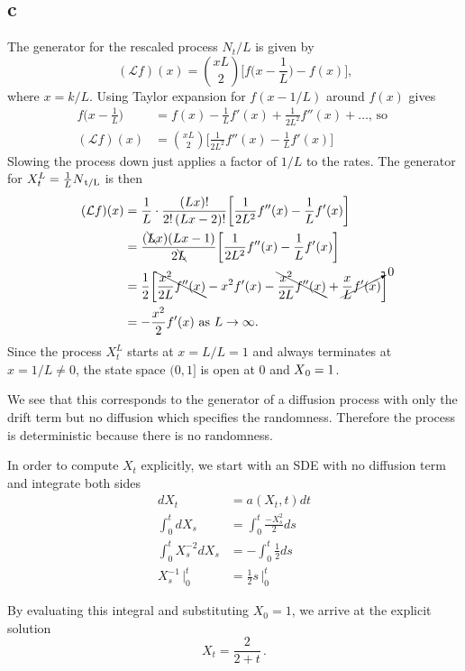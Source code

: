 \documentclass[12pt, twoside, a4paper]{article}
\newcommand{\Gen}{\mathcal{L}}
\begin{document}
\subsection*{c}
The generator for the rescaled process $N_t / L$ is given by 
\[
(\Gen f)(x) = {xL \choose 2} \bigg[ f \bigg(x - \frac{1}{L} \bigg) - f(x) \bigg] \text{,}
\]
where $x = k/L$. Using Taylor expansion for $f(x-1/L)$ around $f(x)$ gives
\begin{align*}
f \bigg(x - \frac{1}{L} \bigg) &= f(x) - \frac{1}{L}f'(x) + \frac{1}{2L^2}f''(x) + \dots \text{, so }\\
(\Gen f)(x) &= {xL \choose 2} \bigg[ \frac{1}{2L^2}f''(x) - \frac{1}{L}f'(x) \bigg]
\end{align*}
Slowing the process down just applies a factor of $1/L$ to the rates. The generator for $X_t^L= \frac{1}{L} N \textsubscript{t/L}$ is then 
\begin{align*}
(\Gen f)(x) 
&= \frac{1}{L} \cdot \frac{(Lx)!}{2! \, (Lx-2)!} \bigg[ \frac{1}{2L^2}f''(x) - \frac{1}{L}f'(x) \bigg]\\
&= \frac{(\bcancel{L}x)(Lx-1)}{2\bcancel{L}} \bigg[ \frac{1}{2L^2}f''(x) - \frac{1}{L}f'(x) \bigg]\\
&= \frac{1}{2} \bigg[ \bcancel{\frac{x^2}{2L}f''(x)} - x^2 f'(x) - \bcancel{\frac{x^2}{2L}f''(x)} + \cancelto{0}{\frac{x}{L}f'(x)} \bigg]\\
&= - \frac{x^2}{2} f'(x) \text{ as } L \to \infty \text{.}
\end{align*}
Since the process $X_t^L$ starts at $x = L/L = 1$ and always terminates at $x = 1/L \neq 0$, the state space $(0, 1]$ is open at $0$ and  $X \textsubscript{0} = 1$.

We see that this corresponds to the generator of a diffusion process with only the drift term but no diffusion which specifies the randomness. Therefore the process is deterministic because there is no randomness. 

In order to compute $X_t$ explicitly, we start with an SDE with no diffusion term and integrate both sides
\begin{align*}
dX_t &= a(X_t, t) dt \\
\int_0^t dX_s &= \int_0^t \frac{-X_s^2}{2} ds \\
\int_0^t X_s^{-2} dX_s &= - \int_0^t \frac{1}{2} ds \\ 
X_s^{-1} \, \Big| _0^t &= \frac{1}{2} s \, \Big| _0^t
\end{align*}

By evaluating this integral and substituting $X_0 = 1$, we arrive at the explicit solution
\[
X_t = \frac{2}{2+t} \, \text{.}
\]
\end{document}
